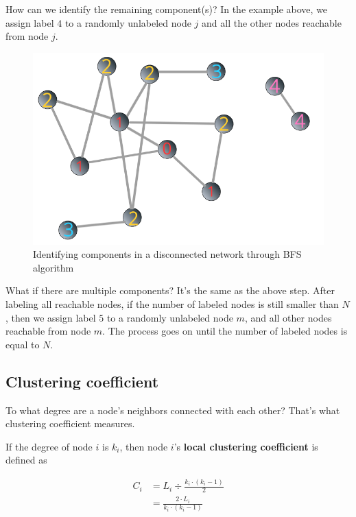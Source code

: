 \documentclass[
]{krantz}
\begin{document}
How can we identify the remaining component(s)? In the example above, we assign label \(4\) to a randomly unlabeled node \(j\) and all the other nodes reachable from node \(j\).

\begin{figure}

{\centering \includegraphics[width=0.65\linewidth]{images/bfsD3} 

}

\caption{Identifying components in a disconnected network through BFS algorithm}\label{fig:bfsD3}
\end{figure}

What if there are multiple components? It's the same as the above step. After labeling all reachable nodes, if the number of labeled nodes is still smaller than \(N\), then we assign label \(5\) to a randomly unlabeled node \(m\), and all other nodes reachable from node \(m\). The process goes on until the number of labeled nodes is equal to \(N\).

\hypertarget{clustering-coefficient}{%
\subsection{Clustering coefficient}\label{clustering-coefficient}}

To what degree are a node's neighbors connected with each other? That's what clustering coefficient measures.

If the degree of node \(i\) is \(k_i\), then node \(i\)'s \textbf{local clustering coefficient} is defined as

\begin{equation}
\begin{split}
  C_i & = L_i ÷ \frac{k_i \cdot (k_i - 1)}{2} \\
  & = \frac{2 \cdot L_i}{k_i \cdot (k_i - 1)}
\end{split}
\label{eq:localClustering}
\end{equation}
\end{document}
